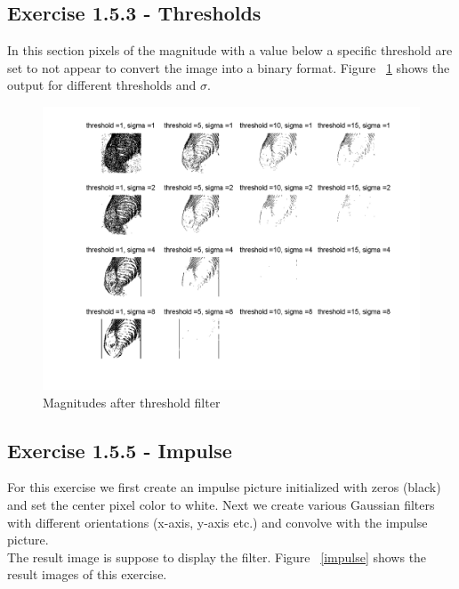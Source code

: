 \documentclass[11pt]{article}
\begin{document}
\subsection{Exercise 1.5.3 - Thresholds}
In this section pixels of the magnitude with a value below a specific threshold are set to not appear to convert the image into a binary format. Figure ~\ref{threshold} shows the output for different thresholds and $\sigma$.

\begin{figure}[h!]
\includegraphics[scale=0.6]{threshold.png}
\caption{Magnitudes after threshold filter}
\label{threshold}
\end{figure}

\subsection{Exercise 1.5.5 - Impulse}
For this exercise we first create an impulse picture initialized with zeros (black) and set the center pixel color to white. Next we create various Gaussian filters with different orientations (x-axis, y-axis etc.) and convolve with the impulse picture.\\
The result image is suppose to display the filter. Figure ~\ref{impulse} shows the result images of this exercise.
\end{document}
